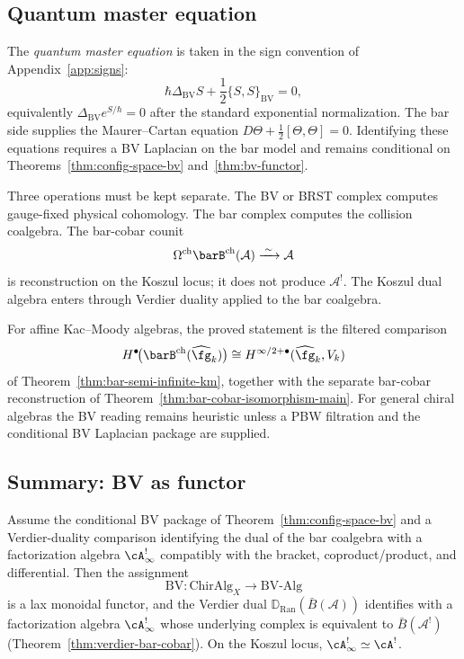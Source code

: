 \subsection{Quantum master equation}

\begin{remark}
\label{rem:quantum-master-complete}%
The \emph{quantum master equation} is taken in the sign convention
of Appendix~\ref{app:signs}:
\[
\hbar \Delta_{\mathrm{BV}} S
+ \frac{1}{2}\{S,S\}_{\mathrm{BV}} = 0,
\]
equivalently $\Delta_{\mathrm{BV}} e^{S/\hbar}=0$ after the standard
exponential normalization. The bar side supplies the Maurer--Cartan
equation
$D\Theta+\frac{1}{2}[\Theta,\Theta]=0$. Identifying these equations
requires a BV Laplacian on the bar model and remains conditional on
Theorems~\ref{thm:config-space-bv} and~\ref{thm:bv-functor}.
\end{remark}

\begin{remark}
\label{rem:bv-equals-bar-cobar}%
Three operations must be kept separate. The BV or BRST complex computes
gauge-fixed physical cohomology. The bar complex computes the
collision coalgebra. The bar-cobar counit
\[
\Omega^{\mathrm{ch}}\barB^{\mathrm{ch}}(\mathcal{A})
\xrightarrow{\;\sim\;} \mathcal{A}
\]
is reconstruction on the Koszul locus; it does not produce
$\mathcal{A}^!$. The Koszul dual algebra enters through
Verdier duality applied to the bar coalgebra.

For affine Kac--Moody algebras, the proved statement is the filtered
comparison
\[
H^\bullet\!\bigl(\barB^{\mathrm{ch}}(\widehat{\fg}_k)\bigr)
\cong
H^{\infty/2+\bullet}(\widehat{\fg}_k,V_k)
\]
of Theorem~\ref{thm:bar-semi-infinite-km}, together with the separate
bar-cobar reconstruction of
Theorem~\ref{thm:bar-cobar-isomorphism-main}. For general chiral
algebras the BV reading remains heuristic unless a PBW filtration and
the conditional BV Laplacian package are supplied.
\end{remark}

\subsection{Summary: BV as functor}

\begin{theorem}
\label{thm:bv-functor}
Assume the conditional BV package of
Theorem~\ref{thm:config-space-bv} and a Verdier-duality comparison
identifying the dual of the bar coalgebra with a factorization algebra
$\cA^!_\infty$ compatibly with the bracket, coproduct/product, and
differential. Then the assignment
\[\mathrm{BV}: \mathrm{ChirAlg}_X \longrightarrow \mathrm{BV\text{-}Alg}\]
is a lax monoidal functor, and the Verdier dual
$\mathbb{D}_{\operatorname{Ran}}(\bar{B}(\mathcal{A}))$ identifies
with a factorization algebra $\cA^!_\infty$ whose underlying complex
is equivalent to $\bar{B}(\mathcal{A}^!)$
\textup{(}Theorem~\textup{\ref{thm:verdier-bar-cobar}}\textup{)}.
On the Koszul locus, $\cA^!_\infty \simeq \cA^!$.
\end{theorem}

